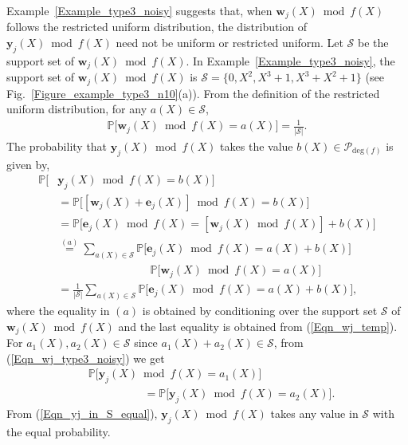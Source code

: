 \documentclass[10pt,journal]{IEEEtran}
\def \deg{{\mathrm{deg}}}
\def \Fig {Fig.}
\begin{document}
Example~\ref{Example_type3_noisy} suggests that, when $\mathbf{w}_j(X) \bmod f(X)$ follows the restricted uniform distribution, 
the distribution of $\mathbf{y}_j(X) \bmod f(X)$ need not be uniform or restricted uniform.
Let $\mathcal{S}$ be the support set of $\mathbf{w}_j(X) \bmod f(X)$.
In Example~\ref{Example_type3_noisy}, the support set of $\mathbf{w}_j(X) \bmod f(X)$ is $\mathcal{S} = \{ 0, X^2, X^3+1, X^3+X^2+1\}$ 
(see \Fig~\ref{Figure_example_type3_n10}(a)).
From the definition of the restricted uniform distribution, for any $a(X) \in \mathcal{S}$, 
% 
\begin{align}
%  
\mathbb{P}\Big[\mathbf{w}_j(X) \bmod f(X) = a(X)\Big] = \frac{1}{|\mathcal{S}|}.
\label{Eqn_wj_temp}
% 
\end{align}
% 
The probability that $\mathbf{y}_j(X) \bmod f(X)$ takes the value $b(X)\in \mathcal{P}_{\deg(f)}$ is given by,
% 
\begin{align}
%  
\mathbb{P}\Big[& \mathbf{y}_j(X) \bmod f(X) = b(X)\Big] \nonumber \\
&= \mathbb{P}\Big[ [\mathbf{w}_j(X) + \mathbf{e}_j(X)] \bmod f(X) = b(X) \Big] \nonumber \\
&= \mathbb{P}\Big[ \mathbf{e}_j(X) \bmod f(X) = [\mathbf{w}_j(X) \bmod f(X)] + b(X) \Big] \nonumber \\
&\stackrel{(a)}{=} \sum_{a(X) \in \mathcal{S}} \mathbb{P}\Big[ \mathbf{e}_j(X) \bmod f(X) = a(X) + b(X) \Big] \nonumber \\
&\mbox{~~~~~~~~~~~~~~~~~~~~~~~~~} \mathbb{P}\Big[\mathbf{w}_j(X) \bmod f(X) = a(X)\Big] \nonumber \\
&= \frac{1}{|\mathcal{S}|} \sum_{a(X) \in \mathcal{S}} \mathbb{P}\Big[ \mathbf{e}_j(X) \bmod f(X) = a(X) + b(X) \Big],
% 
\label{Eqn_wj_type3_noisy}
% 
\end{align}
% 
where the equality in $(a)$ is obtained by conditioning over the support set $\mathcal{S}$ of $\mathbf{w}_j(X) \bmod f(X)$ and
the last equality is obtained from (\ref{Eqn_wj_temp}).
% 
For $a_1(X), a_2(X) \in \mathcal{S}$ since $a_1(X) + a_2(X) \in \mathcal{S}$,
from (\ref{Eqn_wj_type3_noisy}) we get
% 
\begin{align}
%  
& \mathbb{P}\Big[\mathbf{y}_j(X) \bmod f(X) = a_1(X)\Big] \nonumber \\
&\mbox{~~~~~~~~~~~~~~~}= \mathbb{P}\Big[\mathbf{y}_j(X) \bmod f(X) = a_2(X)\Big].
\label{Eqn_yj_in_S_equal}
% 
\end{align}
% 
From (\ref{Eqn_yj_in_S_equal}), $\mathbf{y}_j(X) \bmod f(X)$ takes any value in $\mathcal{S}$ with the equal probability.
\end{document}
